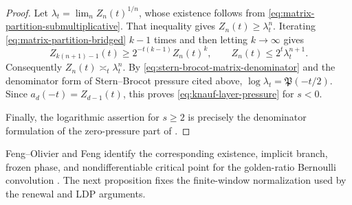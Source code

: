 \begin{proof}
Let \(\lambda_t=\lim_n Z_n(t)^{1/n}\), whose existence follows from
\eqref{eq:matrix-partition-submultiplicative}.  That inequality gives
\(Z_n(t)\ge\lambda_t^n\).  Iterating
\eqref{eq:matrix-partition-bridged} \(k-1\) times and then letting
\(k\to\infty\) gives
\[
 Z_{k(n+1)-1}(t)\ge2^{-t(k-1)}Z_n(t)^k,
 \qquad
 Z_n(t)\le2^t\lambda_t^{n+1}.
\]
Consequently \(Z_n(t)\asymp_t\lambda_t^n\).  By
\eqref{eq:stern-brocot-matrix-denominator} and the denominator form of
Stern--Brocot pressure cited above,
\(\log\lambda_t=\mathfrak P(-t/2)\).  Since
\(a_d(-t)=Z_{d-1}(t)\), this proves
\eqref{eq:knauf-layer-pressure} for \(s<0\).

Finally, the logarithmic assertion for \(s\ge2\) is precisely the
denominator formulation of the zero-pressure part of
\cite[Thm.~1.1]{KessebohmerStratmann2007}.
\end{proof}

Feng--Olivier and Feng identify the corresponding existence, implicit branch,
frozen phase, and nondifferentiable critical point for the golden-ratio
Bernoulli convolution \cite{FengOlivier2003,Feng2005}.  The next proposition
fixes the finite-window normalization used by the renewal and LDP arguments.

